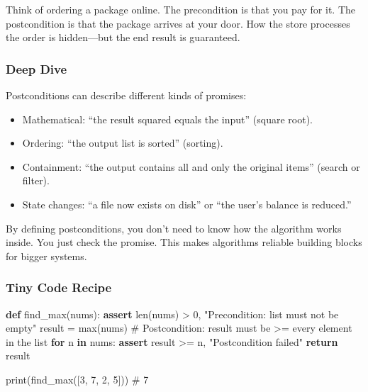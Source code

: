 \documentclass[
  letterpaper,
  DIV=11,
  numbers=noendperiod]{scrreprt}
\newenvironment{Shaded}{\begin{snugshade}}{\end{snugshade}}
\newcommand{\BuiltInTok}[1]{\textcolor[rgb]{0.00,0.23,0.31}{#1}}
\newcommand{\CommentTok}[1]{\textcolor[rgb]{0.37,0.37,0.37}{#1}}
\newcommand{\ControlFlowTok}[1]{\textcolor[rgb]{0.00,0.23,0.31}{\textbf{#1}}}
\newcommand{\DecValTok}[1]{\textcolor[rgb]{0.68,0.00,0.00}{#1}}
\newcommand{\KeywordTok}[1]{\textcolor[rgb]{0.00,0.23,0.31}{\textbf{#1}}}
\newcommand{\NormalTok}[1]{\textcolor[rgb]{0.00,0.23,0.31}{#1}}
\newcommand{\OperatorTok}[1]{\textcolor[rgb]{0.37,0.37,0.37}{#1}}
\newcommand{\StringTok}[1]{\textcolor[rgb]{0.13,0.47,0.30}{#1}}
\providecommand{\tightlist}{%
  \setlength{\itemsep}{0pt}\setlength{\parskip}{0pt}}
\begin{document}
Think of ordering a package online. The precondition is that you pay for
it. The postcondition is that the package arrives at your door. How the
store processes the order is hidden---but the end result is guaranteed.

\subsubsection{Deep Dive}\label{deep-dive-36}

Postconditions can describe different kinds of promises:

\begin{itemize}
\tightlist
\item
  Mathematical: ``the result squared equals the input'' (square root).
\item
  Ordering: ``the output list is sorted'' (sorting).
\item
  Containment: ``the output contains all and only the original items''
  (search or filter).
\item
  State changes: ``a file now exists on disk'' or ``the user's balance
  is reduced.''
\end{itemize}

By defining postconditions, you don't need to know how the algorithm
works inside. You just check the promise. This makes algorithms reliable
building blocks for bigger systems.

\subsubsection{Tiny Code Recipe}\label{tiny-code-recipe-64}

\begin{Shaded}
\begin{Highlighting}[]
\KeywordTok{def}\NormalTok{ find\_max(nums):}
    \ControlFlowTok{assert} \BuiltInTok{len}\NormalTok{(nums) }\OperatorTok{\textgreater{}} \DecValTok{0}\NormalTok{, }\StringTok{"Precondition: list must not be empty"}
\NormalTok{    result }\OperatorTok{=} \BuiltInTok{max}\NormalTok{(nums)}
    \CommentTok{\# Postcondition: result must be \textgreater{}= every element in the list}
    \ControlFlowTok{for}\NormalTok{ n }\KeywordTok{in}\NormalTok{ nums:}
        \ControlFlowTok{assert}\NormalTok{ result }\OperatorTok{\textgreater{}=}\NormalTok{ n, }\StringTok{"Postcondition failed"}
    \ControlFlowTok{return}\NormalTok{ result}

\BuiltInTok{print}\NormalTok{(find\_max([}\DecValTok{3}\NormalTok{, }\DecValTok{7}\NormalTok{, }\DecValTok{2}\NormalTok{, }\DecValTok{5}\NormalTok{]))  }\CommentTok{\# 7}
\end{Highlighting}
\end{Shaded}
\end{document}
